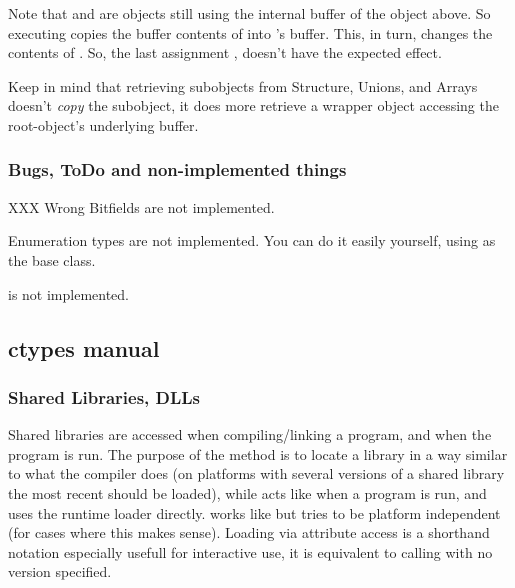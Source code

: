 Note that  and  are objects still using the internal
buffer of the  object above. So executing 
copies the buffer contents of  into  's buffer.  This,
in turn, changes the contents of . So, the last assignment
, doesn't have the expected effect.

Keep in mind that retrieving subobjects from Structure, Unions, and
Arrays doesn't \emph{copy} the subobject, it does more retrieve a wrapper
object accessing the root-object's underlying buffer.


\subsubsection{Bugs, ToDo and non-implemented things\label{ctypes-bugs-todo-non-implemented-things}}

\begin{datadescni}{XXX Wrong}
Bitfields are not implemented.

Enumeration types are not implemented. You can do it easily
yourself, using  as the base class.

 is not implemented.

\end{datadescni}


\subsection{ctypes manual\label{ctypes-ctypes-manual}}


\subsubsection{Shared Libraries, DLLs\label{ctypes-shared-libraries-dlls}}

Shared libraries are accessed when compiling/linking a program, and
when the program is run. The purpose of the  method is to
locate a library in a way similar to what the compiler does (on
platforms with several versions of a shared library the most recent
should be loaded), while  acts like when a program is run, and
uses the runtime loader directly.  works like 
but tries to be platform independent (for cases where this makes
sense). Loading via attribute access is a shorthand notation
especially usefull for interactive use, it is equivalent to calling
 with no version specified.



